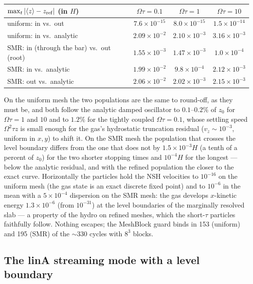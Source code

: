 \documentclass[11pt]{article}
\begin{document}
\begin{center}
\small
\begin{tabular}{@{}lccc@{}}
\toprule
$\max_t |\langle z\rangle - z_{\rm ref}|$ (in $H$) & $\Omega\tau = 0.1$ & $\Omega\tau = 1$ & $\Omega\tau = 10$ \\
\midrule
uniform: in vs.\ out & $7.6\times10^{-15}$ & $8.0\times10^{-15}$ & $1.5\times10^{-14}$ \\
uniform: in vs.\ analytic & $2.09\times10^{-2}$ & $2.10\times10^{-3}$ & $3.16\times10^{-3}$ \\
SMR: in (through the bar) vs.\ out (root) & $1.55\times10^{-3}$ & $1.47\times10^{-3}$ & $1.0\times10^{-4}$ \\
SMR: in vs.\ analytic & $1.99\times10^{-2}$ & $9.8\times10^{-4}$ & $2.12\times10^{-3}$ \\
SMR: out vs.\ analytic & $2.06\times10^{-2}$ & $2.02\times10^{-3}$ & $2.15\times10^{-3}$ \\
\bottomrule
\end{tabular}
\end{center}

On the uniform mesh the two populations are the same to round-off, as they must be, and
both follow the analytic damped oscillator to $0.1$--$0.2\%$ of $z_0$ for $\Omega\tau = 1$
and $10$ and to $1.2\%$ for the tightly coupled $\Omega\tau = 0.1$, whose settling speed
$\Omega^2\tau z$ is small enough for the gas's hydrostatic truncation residual
($v_z \sim 10^{-3}$, uniform in $x,y$) to shift it. On the SMR mesh the population that
crosses the level boundary differs from the one that does not by $1.5\times10^{-3}H$
(a tenth of a percent of $z_0$) for the two shorter stopping times and $10^{-4}H$ for
the longest --- below the analytic residual, and with the refined population the closer to
the exact curve. Horizontally the particles hold the NSH velocities to $10^{-16}$ on the
uniform mesh (the gas state is an exact discrete fixed point) and to $10^{-6}$ in the mean
with a $5\times10^{-4}$ dispersion on the SMR mesh: the gas develops $x$-kinetic energy
$1.3\times10^{-6}$ (from $10^{-31}$) at the level boundaries of the marginally resolved
slab --- a property of the hydro on refined meshes, which the short-$\tau$ particles
faithfully follow. Nothing escapes; the MeshBlock guard binds in 153 (uniform) and 195
(SMR) of the $\sim$330 cycles with $8^3$ blocks.

\subsection{The linA streaming mode with a level boundary}
\end{document}
